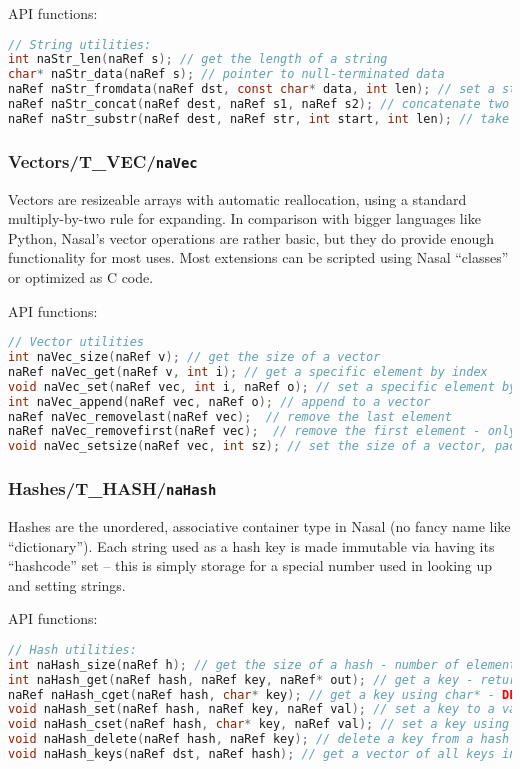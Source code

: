 \documentclass{article}
\newcommand{\todo}[1]{}
\newcommand{\type}[1]{\textcolor{type}{\tt #1}}
\begin{document}
API functions:
\begin{lstlisting}[language=C]
// String utilities:
int naStr_len(naRef s); // get the length of a string
char* naStr_data(naRef s); // pointer to null-terminated data
naRef naStr_fromdata(naRef dst, const char* data, int len); // set a string's data and length
naRef naStr_concat(naRef dest, naRef s1, naRef s2); // concatenate two strings
naRef naStr_substr(naRef dest, naRef str, int start, int len); // take a subscript of a string
\end{lstlisting}


\subsubsection{Vectors/T\_VEC/\type{naVec}}
Vectors are resizeable arrays with automatic reallocation, using a standard multiply-by-two rule for expanding.  In comparison with bigger languages like Python, Nasal's vector operations are rather basic, but they do provide enough functionality for most uses.  Most extensions can be scripted using Nasal ``classes'' or optimized as C code.

API functions:
\begin{lstlisting}[language=C]
// Vector utilities
int naVec_size(naRef v); // get the size of a vector
naRef naVec_get(naRef v, int i); // get a specific element by index
void naVec_set(naRef vec, int i, naRef o); // set a specific element by index
int naVec_append(naRef vec, naRef o); // append to a vector
naRef naVec_removelast(naRef vec);  // remove the last element
naRef naVec_removefirst(naRef vec);  // remove the first element - only in SimGear!
void naVec_setsize(naRef vec, int sz); // set the size of a vector, padding with naNil()
\end{lstlisting}

\subsubsection{Hashes/T\_HASH/\type{naHash}}
Hashes are the unordered, associative container type in Nasal (no fancy name like ``dictionary''). Each string used as a hash key is made immutable via having its ``hashcode'' set -- this is simply storage for a special number used in looking up and setting strings.
\todo{Only added as a quick reference, patch interpreter to create bytefield dumps for hashes?}

API functions:
\begin{lstlisting}[language=C]
// Hash utilities:
int naHash_size(naRef h); // get the size of a hash - number of elements
int naHash_get(naRef hash, naRef key, naRef* out); // get a key - returns 1 if it is found
naRef naHash_cget(naRef hash, char* key); // get a key using char* - DEPRECATED!
void naHash_set(naRef hash, naRef key, naRef val); // set a key to a value
void naHash_cset(naRef hash, char* key, naRef val); // set a key using char* - DEPRECATED!
void naHash_delete(naRef hash, naRef key); // delete a key from a hash
void naHash_keys(naRef dst, naRef hash); // get a vector of all keys in the hash
\end{lstlisting}
\end{document}
